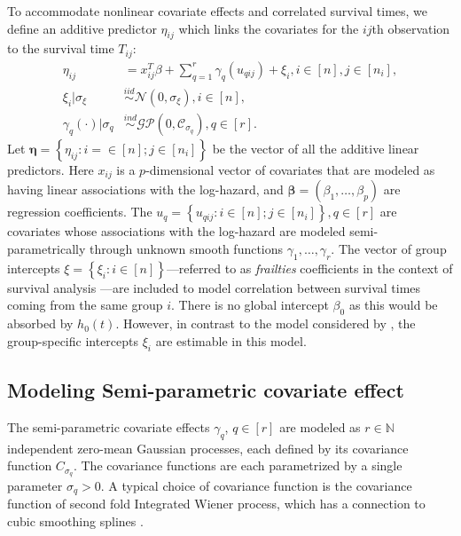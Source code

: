 \documentclass[ba]{imsart}
\begin{document}
To accommodate nonlinear covariate effects and correlated survival times, we define an additive predictor $\eta_{ij}$ which links the covariates for the $ij$th observation to the survival time $T_{ij}$:
\begin{equation}\begin{aligned}\label{eqn:eta}
\eta_{ij} &=x_{ij}^{T}\beta+\sum_{q=1}^{r} \gamma_q(u_{qij}) +\xi_{i} , i\in[n],j\in[n_{i}], \\
\xi_i | \sigma_{\xi} &\overset{iid}{\sim} \mathcal{N}(0,\sigma_{\xi}) , i\in[n], \\
\gamma_{q}(\cdot)|\sigma_{q} &\overset{ind}{\sim} \mathcal{GP}\left(0,\mathcal{C}_{\sigma_q}\right), q\in[r].
\end{aligned}\end{equation}
Let $ \boldsymbol{\eta} = \left\{ \eta_{ij}: i = \in [n]; j\in[n_{i}] \right\}$ be the vector of all the additive linear predictors. Here $x_{ij}$ is a $p$-dimensional vector of covariates that are modeled as having linear associations with the log-hazard, and $\boldsymbol{\beta} = (\beta_{1},\ldots,\beta_{p})$ are regression coefficients. The $u_{q} = \left\{u_{qij}: i \in [n]; j \in[n_{i}] \right\}, q \in [r]$ are covariates whose associations with the log-hazard are modeled semi-parametrically through unknown smooth functions $\gamma_1,\ldots,\gamma_r$. The vector of group intercepts $\xi = \left\{ \xi_{i}: i \in [n] \right\}$---referred to as \textit{frailties} coefficients in the context of survival analysis \citep{frailty}---are included to model correlation between survival times coming from the same group $i$. There is no global intercept $\beta_{0}$ as this would be absorbed by $h_{0}(t)$. However, in contrast to the model considered by \cite{casecross}, the group-specific intercepts $\xi_{i}$ are estimable in this model.

\subsection{Modeling Semi-parametric covariate effect}\label{subsec:smooth}

The semi-parametric covariate effects $\gamma_q$, $q \in [r]$ are modeled as $r\in\mathbb{N}$ independent zero-mean Gaussian processes, each defined by its covariance function $C_{\sigma_{q}}$. The covariance functions are each parametrized by a single parameter $\sigma_q > 0$. A typical choice of covariance function is the covariance function of second fold Integrated Wiener process\citep{wiener}, which has a connection to cubic smoothing splines \citep{wahbaprior}.
\end{document}
